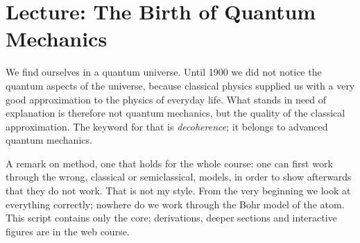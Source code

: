 
\section{Lecture: The Birth of Quantum Mechanics}
We find ourselves in a quantum universe. Until 1900 we did not notice the quantum aspects of the universe, because classical physics supplied us with a very good approximation to the physics of everyday life. What stands in need of explanation is therefore not quantum mechanics, but the quality of the classical approximation. The keyword for that is \emph{decoherence}; it belongs to advanced quantum mechanics.

A remark on method, one that holds for the whole course: one can first work through the wrong, classical or semiclassical, models, in order to show afterwards that they do not work. That is not my style. From the very beginning we look at everything correctly; nowhere do we work through the Bohr model of the atom. This script contains only the core; derivations, deeper sections and interactive figures are in the web course.

